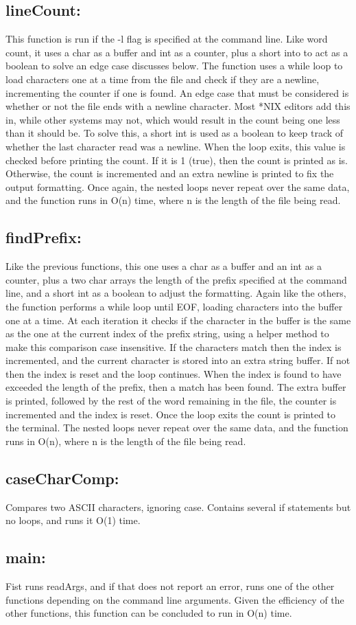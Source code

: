 \documentclass[letterpaper,12pt]{article}
\begin{document}
\subsection{lineCount:}
This function is run if the -l flag is specified at the command line. Like word count, it uses a char as a buffer and int as a counter, plus a short into to act as a boolean to solve an edge case discusses below. The function uses a while loop to load characters one at a time from the file and check if they are a newline, incrementing the counter if one is found. An edge case that must be considered is whether or not the file ends with a newline character. Most *NIX editors add this in, while other systems may not, which would result in the count being one less than it should be. To solve this, a short int is used as a boolean to keep track of whether the last character read was a newline. When the loop exits, this value is checked before printing the count. If it is 1 (true), then the count is printed as is. Otherwise, the count is incremented and an extra newline is printed to fix the output formatting. Once again, the nested loops never repeat over the same data, and the function runs in O(n) time, where n is the length of the file being read.

\subsection{findPrefix:}
Like the previous functions, this one uses a char as a buffer and an int as a counter, plus a two char arrays the length of the prefix specified at the command line, and a short int as a boolean to adjust the formatting. Again like the others, the function performs a while loop until EOF, loading characters into the buffer one at a time. At each iteration it checks if the character in the buffer is the same as the one at the current index of the prefix string, using a helper method to make this comparison case insensitive. If the characters match then the index is incremented, and the current character is stored into an extra string buffer. If not then the index is reset and the loop continues. When the index is found to have exceeded the length of the prefix, then a match has been found. The extra buffer is printed, followed by the rest of the word remaining in the file, the counter is incremented and the index is reset. Once the loop exits the count is printed to the terminal. The nested loops never repeat over the same data, and the function runs in O(n), where n is the length of the file being read.

\subsection{caseCharComp:}
Compares two ASCII characters, ignoring case. Contains several if statements but no loops, and runs it O(1) time.

\subsection{main:}
Fist runs readArgs, and if that does not report an error, runs one of the other functions depending on the command line arguments. Given the efficiency of the other functions, this function can be concluded to run in O(n) time.
\end{document}
